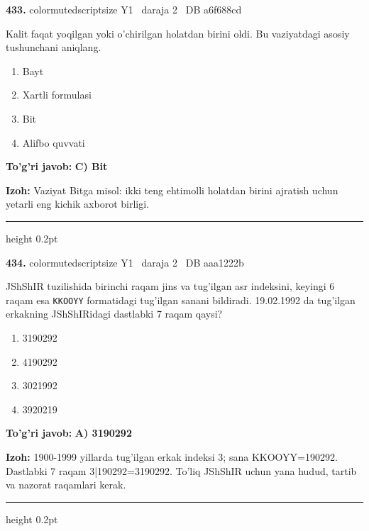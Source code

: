\documentclass[10pt,a4paper,oneside]{article}
\begin{document}
\noindent\textbf{\color{ink}433.}  {color{muted}scriptsize Y1 \textbullet\ daraja 2 \textbullet\ DB a6f688cd}
\par
Kalit faqat yoqilgan yoki o'chirilgan holatdan birini oldi. Bu vaziyatdagi asosiy tushunchani aniqlang.
\begin{enumerate}[label=\Alph*),leftmargin=9mm]
\item Bayt
\item Xartli formulasi
\item Bit
\item Alifbo quvvati
\end{enumerate}
\begin{tcolorbox}[enhanced,breakable,colback=teal!4,colframe=teal!50!black,boxrule=0.5pt,arc=1.1mm,left=3mm,right=3mm,top=1.7mm,bottom=1.7mm,before skip=2mm,after skip=2mm]
\textbf{\color{teal}To'g'ri javob:} \textbf{C) Bit}
\par\smallskip
\textbf{Izoh:} Vaziyat Bitga misol: ikki teng ehtimolli holatdan birini ajratish uchun yetarli eng kichik axborot birligi.
\end{tcolorbox}
\vspace{2mm}\hrule height 0.2pt \vspace{3mm}

\noindent\textbf{\color{ink}434.}  {color{muted}scriptsize Y1 \textbullet\ daraja 2 \textbullet\ DB aaa1222b}
\par
JShShIR tuzilishida birinchi raqam jins va tug'ilgan asr indeksini, keyingi 6 raqam esa \texttt{KKOOYY} formatidagi tug'ilgan sanani bildiradi. 19.02.1992 da tug'ilgan erkakning JShShIRidagi dastlabki 7 raqam qaysi?
\begin{enumerate}[label=\Alph*),leftmargin=9mm]
\item 3190292
\item 4190292
\item 3021992
\item 3920219
\end{enumerate}
\begin{tcolorbox}[enhanced,breakable,colback=teal!4,colframe=teal!50!black,boxrule=0.5pt,arc=1.1mm,left=3mm,right=3mm,top=1.7mm,bottom=1.7mm,before skip=2mm,after skip=2mm]
\textbf{\color{teal}To'g'ri javob:} \textbf{A) 3190292}
\par\smallskip
\textbf{Izoh:} 1900-1999 yillarda tug'ilgan erkak indeksi 3; sana KKOOYY=190292. Dastlabki 7 raqam 3|190292=3190292. To'liq JShShIR uchun yana hudud, tartib va nazorat raqamlari kerak.
\end{tcolorbox}
\vspace{2mm}\hrule height 0.2pt \vspace{3mm}
\end{document}
